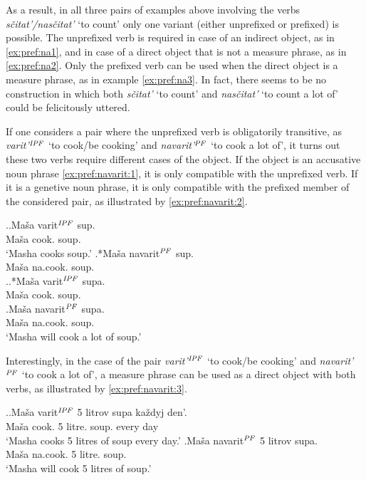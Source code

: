 As a result, in all three pairs of examples above involving the verbs \textit{s\v{c}itat'/nas\v{c}itat'} `to count' only one variant (either unprefixed or prefixed) is possible. The unprefixed verb is required in case of an indirect object, as in \ref{ex:pref:na1}, and in case of a direct object that is not a measure phrase, as in \ref{ex:pref:na2}. Only the prefixed verb can be used when the direct object is a measure phrase, as in example \ref{ex:pref:na3}. In fact, there seems to be no construction in which both \textit{s\v{c}itat'} `to count' and \textit{nas\v{c}itat'} `to count a lot of' could be felicitously uttered.

If one considers a pair where the unprefixed verb is obligatorily transitive, as \textit{varit'}$^{\mathit{IPF}}$ `to cook/be cooking' and \textit{navarit'}$^{\mathit{PF}}$ `to cook a lot of', it turns out these two verbs require different cases of the object. If the object is an accusative noun phrase \ref{ex:pref:navarit:1}, it is only compatible with the unprefixed verb. If it is a genetive noun phrase, it is only compatible with the prefixed member of the considered pair, as illustrated by \ref{ex:pref:navarit:2}.

\ex.\label{ex:pref:navarit:1}\ag.\label{ex:varit:1}Ma\v{s}a varit$^{\mathit{IPF}}$ sup.\\
Ma\v{s}a cook. soup.\\
\vspace{0.5em}
`Masha cooks soup.'
\bg.*Ma\v{s}a navarit$^{\mathit{PF}}$ sup.\label{ex:navarit1}\\
Ma\v{s}a na.cook. soup.\\

\ex.\label{ex:pref:navarit:2}\ag.*Ma\v{s}a varit$^{\mathit{IPF}}$ supa.\label{ex:varit2}\\
Ma\v{s}a cook. soup.\\
\bg.\label{ex:navarit2}Ma\v{s}a navarit$^{\mathit{PF}}$ supa.\\
Ma\v{s}a na.cook. soup.\\
\vspace{0.5em}
`Masha will cook a lot of soup.'

Interestingly, in the case of the pair \textit{varit'}$^{\mathit{IPF}}$ `to cook/be cooking' and \textit{navarit'}$^{\mathit{PF}}$ `to cook a lot of', a measure phrase can be used as a direct object with both verbs, as illustrated by \ref{ex:pref:navarit:3}.

\ex.\label{ex:pref:navarit:3}\ag.\label{ex:varit3}Ma\v{s}a varit$^{\mathit{IPF}}$ 5 litrov supa ka\v{z}dyj den'.\\
Ma\v{s}a cook. 5 litre. soup. every day\\
\vspace{0.5em}
`Masha cooks 5 litres of soup every day.'
\bg.\label{ex:navarit3}Ma\v{s}a navarit$^{\mathit{PF}}$ 5 litrov supa.\\
Ma\v{s}a na.cook. 5 litre. soup.\\
\vspace{0.5em}
`Masha will cook 5 litres of soup.'

